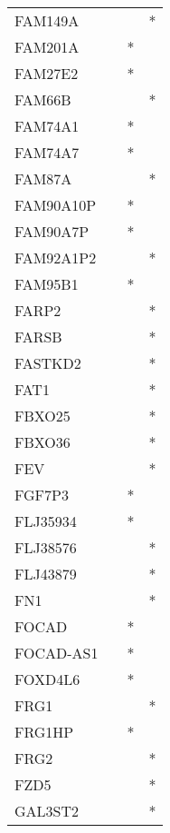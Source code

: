 \begin{longtable}{lccc}
FAM149A        &           &     &       * \\
FAM201A        &           &   * &         \\
FAM27E2        &           &   * &         \\
FAM66B         &           &     &       * \\
FAM74A1        &           &   * &         \\
FAM74A7        &           &   * &         \\
FAM87A         &           &     &       * \\
FAM90A10P      &           &   * &         \\
FAM90A7P       &           &   * &         \\
FAM92A1P2      &           &     &       * \\
FAM95B1        &           &   * &         \\
FARP2          &           &     &       * \\
FARSB          &           &     &       * \\
FASTKD2        &           &     &       * \\
FAT1           &           &     &       * \\
FBXO25         &           &     &       * \\
FBXO36         &           &     &       * \\
FEV            &           &     &       * \\
FGF7P3         &           &   * &         \\
FLJ35934       &           &   * &         \\
FLJ38576       &           &     &       * \\
FLJ43879       &           &     &       * \\
FN1            &           &     &       * \\
FOCAD          &           &   * &         \\
FOCAD-AS1      &           &   * &         \\
FOXD4L6        &           &   * &         \\
FRG1           &           &     &       * \\
FRG1HP         &           &   * &         \\
FRG2           &           &     &       * \\
FZD5           &           &     &       * \\
GAL3ST2        &           &     &       * \\

\end{longtable}
